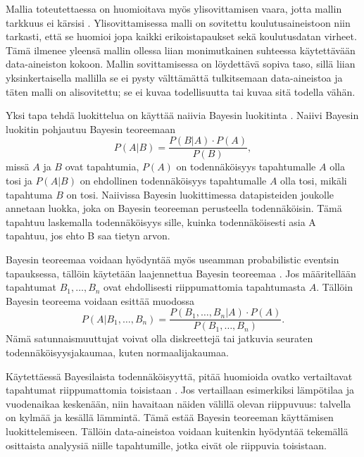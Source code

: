 Mallia toteutettaessa on huomioitava myös ylisovittamisen vaara, jotta mallin tarkkuus ei kärsisi \citep{hamalainenClassifiersEducationalData2010}. Ylisovittamisessa malli on sovitettu koulutusaineistoon niin tarkasti, että se huomioi jopa kaikki erikoistapaukset sekä koulutusdatan virheet. Tämä ilmenee yleensä mallin ollessa liian monimutkainen suhteessa käytettävään data-aineiston kokoon. Mallin sovittamisessa on löydettävä sopiva taso, sillä liian yksinkertaisella mallilla se ei pysty välttämättä tulkitsemaan data-aineistoa ja täten malli on alisovitettu; se ei kuvaa todellisuutta tai kuvaa sitä todella vähän.

Yksi tapa tehdä luokittelua on käyttää naiivia Bayesin luokitinta \citep{natinggaDataScienceAlgorithms2018}. Naiivi Bayesin luokitin pohjautuu Bayesin teoreemaan $$P(A | B) = \frac{P(B | A) \cdot P(A)}{P(B)},$$ missä $A$ ja $B$ ovat tapahtumia, $P(A)$ on todennäköisyys tapahtumalle $A$ olla tosi ja $P(A | B)$ on ehdollinen todennäköisyys tapahtumalle $A$ olla tosi, mikäli tapahtuma $B$ on tosi. Naiivissa Bayesin luokittimessa datapisteiden joukolle annetaan luokka, joka on Bayesin teoreeman perusteella todennäköisin. Tämä tapahtuu laskemalla todennäköisyys sille, kuinka todennäköisesti asia A tapahtuu, jos ehto B saa tietyn arvon.

Bayesin teoreemaa voidaan hyödyntää myös useamman probabilistic eventsin tapauksessa, tällöin käytetään laajennettua Bayesin teoreemaa \citep{natinggaDataScienceAlgorithms2018}. Jos määritellään tapahtumat $B_1, \ldots, B_n$ ovat ehdollisesti riippumattomia tapahtumasta $A$. Tällöin Bayesin teoreema voidaan esittää muodossa $$P(A | B_1, \ldots, B_n) = \frac{P(B_1, \ldots, B_n | A) \cdot P(A)}{P(B_1, \ldots, B_n)}.$$ Nämä satunnaismuuttujat voivat olla diskreettejä tai jatkuvia seuraten todennäköisyysjakaumaa, kuten normaalijakaumaa.

Käytettäessä Bayesilaista todennäköisyyttä, pitää huomioida ovatko vertailtavat tapahtumat riippumattomia toisistaan \citep{natinggaDataScienceAlgorithms2018}. Jos vertaillaan esimerkiksi lämpötilaa ja vuodenaikaa keskenään, niin havaitaan näiden välillä olevan riippuvuus: talvella on kylmää ja kesällä lämmintä. Tämä estää Bayesin teoreeman käyttämisen luokittelemiseen. Tällöin data-aineistoa voidaan kuitenkin hyödyntää tekemällä osittaista analyysiä niille tapahtumille, jotka eivät ole riippuvia toisistaan.

